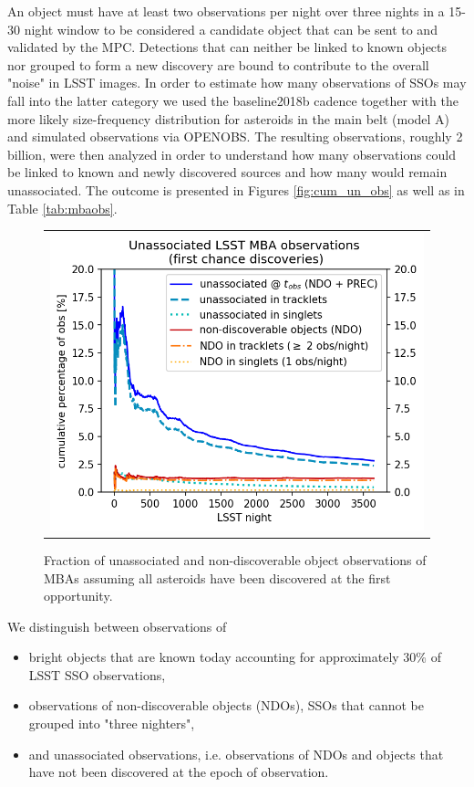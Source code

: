 An object must have at least two observations per night over three nights in a 15-30 night window to be considered a candidate object that can be sent to and validated by the MPC.
Detections that can neither be linked to known objects nor grouped to form a new discovery are bound to contribute to the overall "noise" in LSST images. In order to estimate how many observations of SSOs may fall into the latter category we used the baseline2018b cadence together with the more likely size-frequency distribution for asteroids in the main belt (model A) and simulated observations via OPENOBS. The resulting observations, roughly 2 billion, were then analyzed in order to understand how many observations could be linked to known and newly discovered sources and how many would remain unassociated. The outcome is presented in Figures \ref{fig:cum_un_obs} as well as in Table \ref{tab:mbaobs}. 
\begin{figure}[tb!]
\begin{center}
\begin{tabular}{c}
\includegraphics[width=0.70\linewidth]{figs/unasoc_frac_first_chance2.png}
\end{tabular}
\end{center}
\caption{Fraction of unassociated and non-discoverable object observations of MBAs assuming all asteroids have been discovered at the first opportunity.  \label{fig:ufc} }
\end{figure}
We distinguish between observations of 
\begin{itemize}
\item bright objects that are known today accounting for approximately 30\% of LSST SSO observations,
\item observations of non-discoverable objects (NDOs), SSOs that cannot be grouped into "three nighters", 
\item and unassociated observations, i.e. observations of NDOs and objects that have not been discovered at the epoch of observation.
\end{itemize}
